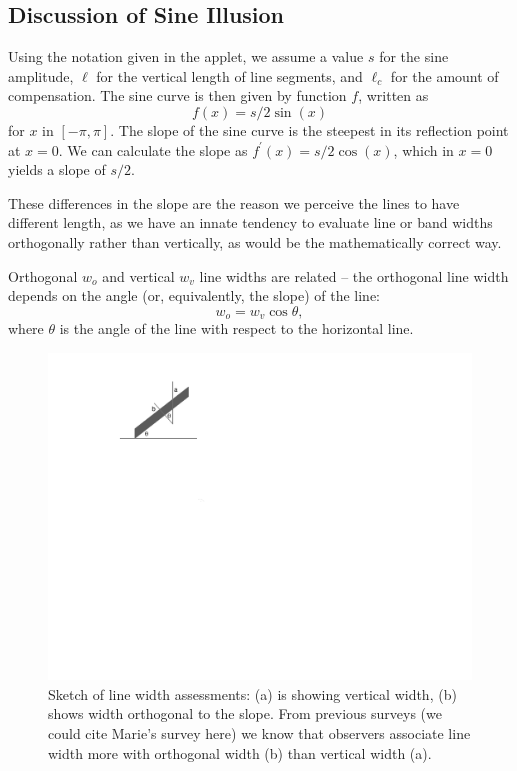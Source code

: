 \documentclass[11pt]{article}\usepackage{graphicx, color}
\begin{document}
\clearpage
\subsection*{Discussion of Sine Illusion}
Using the notation given in the applet, we assume a value $s$ for the sine amplitude, $\ell$ for the vertical length of line segments, and $\ell_c$ for the amount of compensation. 
The sine curve is then given by function $f$, written as 
\[
f(x) = s/2 \sin(x)
\]
for $x$ in $[-\pi, \pi]$. The slope of the sine curve is the steepest in its reflection point at $x=0$. We can calculate the slope as $f^\prime(x) = s/2 \cos(x)$, which in $x=0$ yields a slope of $s/2$.

These differences in the slope are the reason we perceive the lines to have different length, as we have an innate tendency to evaluate line or band widths orthogonally rather than vertically, as would be the mathematically correct way.

Orthogonal $w_o$ and vertical $w_v$ line widths are related -- the orthogonal line width depends on the angle (or, equivalently, the slope) of the line:
\begin{equation}\label{adjust}
w_o = w_v \cos \theta,
\end{equation}
where $\theta$ is the angle of the line with respect to the horizontal line.
\begin{figure}[htbp]
\begin{center}
\includegraphics[width=0.3\linewidth]{images/linewidth}
\end{center}
\caption{\label{fig:linewidth}Sketch of line width assessments: (a) is showing  vertical width, (b) shows  width orthogonal to the slope. From previous surveys (we could cite Marie's survey here) we know that  observers associate line width more with  orthogonal width (b) than vertical width (a).}
\end{figure}
% 
\end{document}
